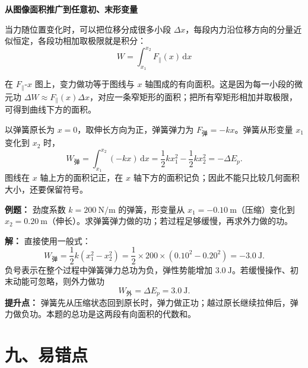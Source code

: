 \begin{competitionbox}
\textbf{从图像面积推广到任意初、末形变量}

当力随位置变化时，可以把位移分成很多小段 $\Delta x$，每段内力沿位移方向的分量近似恒定，各段功相加取极限就是积分：
\[
W = \int_{x_1}^{x_2} F_{\parallel}(x) \, \mathrm dx
\]

在 $F_{\parallel}$-$x$ 图上，变力做功等于图线与 $x$ 轴围成的有向面积。这是因为每一小段的微元功
$\Delta W \approx F_{\parallel}(x)\Delta x$，对应一条窄矩形的面积；把所有窄矩形相加并取极限，
可得到曲线下方的面积。

以弹簧原长为 $x=0$，取伸长方向为正，弹簧弹力为
$F_{\text{弹}}=-kx$。弹簧从形变量 $x_1$ 变化到 $x_2$ 时，
\[
W_{\text{弹}}
=\int_{x_1}^{x_2}(-kx)\,\mathrm dx
=\frac12kx_1^2-\frac12kx_2^2
=-\Delta E_p.
\]
图线在 $x$ 轴上方的面积记正，在 $x$ 轴下方的面积记负；因此不能只比较几何面积大小，还要保留符号。

\begin{center}


\label{fig:spring-work-area}
\end{center}

\textbf{例题：} 劲度系数 $k=200\ \mathrm{N/m}$ 的弹簧，形变量从
$x_1=-0.10\ \mathrm{m}$（压缩）变化到
$x_2=0.20\ \mathrm{m}$（伸长）。求弹簧弹力做的功；若过程足够缓慢，再求外力做的功。

\textbf{解：} 直接使用一般式：
\[
W_{\text{弹}}
=\frac12k(x_1^2-x_2^2)
=\frac12\times200\times(0.10^2-0.20^2)
=-3.0\ \mathrm{J}.
\]
负号表示在整个过程中弹簧弹力总功为负，弹性势能增加
$3.0\ \mathrm{J}$。若缓慢操作、初末动能可忽略，则外力做功
\[
W_{\text{外}}=\Delta E_p=3.0\ \mathrm{J}.
\]
\textbf{提升点：} 弹簧先从压缩状态回到原长时，弹力做正功；越过原长继续拉伸后，弹力做负功。本题的总功是这两段有向面积的代数和。
\end{competitionbox}

\section*{九、易错点}


